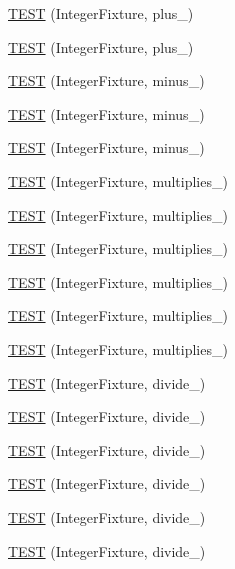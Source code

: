 \begin{DoxyCompactItemize}
\hyperlink{TestInteger_8c_09_09_ad03208e58b9eef087cde74731ea07ea2}{T\-E\-S\-T} (Integer\-Fixture, plus\-\_)
\item 
\hyperlink{TestInteger_8c_09_09_a5a765a1610e8accb499b8c9cc326b8bd}{T\-E\-S\-T} (Integer\-Fixture, plus\-\_)
\item 
\hyperlink{TestInteger_8c_09_09_a66b76ebde47a0ba4baf1e86b594f9b6b}{T\-E\-S\-T} (Integer\-Fixture, minus\-\_)
\item 
\hyperlink{TestInteger_8c_09_09_abc50c0136b8f986105ddb45228e0e588}{T\-E\-S\-T} (Integer\-Fixture, minus\-\_)
\item 
\hyperlink{TestInteger_8c_09_09_a7d88a5482163de39f2bef6f917b6cf05}{T\-E\-S\-T} (Integer\-Fixture, minus\-\_)
\item 
\hyperlink{TestInteger_8c_09_09_a52490569c8c649dc4ea3c13a951efa87}{T\-E\-S\-T} (Integer\-Fixture, multiplies\-\_)
\item 
\hyperlink{TestInteger_8c_09_09_a9b9d314f2b870242605005cd5eb9759d}{T\-E\-S\-T} (Integer\-Fixture, multiplies\-\_)
\item 
\hyperlink{TestInteger_8c_09_09_a36932743fa35b401741d33e46e51e4f8}{T\-E\-S\-T} (Integer\-Fixture, multiplies\-\_)
\item 
\hyperlink{TestInteger_8c_09_09_a229a726c89974a46e594b28a61b51933}{T\-E\-S\-T} (Integer\-Fixture, multiplies\-\_)
\item 
\hyperlink{TestInteger_8c_09_09_a0095bfbc5d9a6c19e76389d113aba7df}{T\-E\-S\-T} (Integer\-Fixture, multiplies\-\_)
\item 
\hyperlink{TestInteger_8c_09_09_aa85c30ebcf3b04d03b587542cbcf4802}{T\-E\-S\-T} (Integer\-Fixture, multiplies\-\_)
\item 
\hyperlink{TestInteger_8c_09_09_a8f50ec3851e8d2f79849a0de878e624b}{T\-E\-S\-T} (Integer\-Fixture, divide\-\_)
\item 
\hyperlink{TestInteger_8c_09_09_a6807f37566bc55344ca3271f3a385eb5}{T\-E\-S\-T} (Integer\-Fixture, divide\-\_)
\item 
\hyperlink{TestInteger_8c_09_09_aef4b9a0a9040642123a311675860aa9d}{T\-E\-S\-T} (Integer\-Fixture, divide\-\_)
\item 
\hyperlink{TestInteger_8c_09_09_a94adfa9c191aae162e9c8a73756f0eae}{T\-E\-S\-T} (Integer\-Fixture, divide\-\_)
\item 
\hyperlink{TestInteger_8c_09_09_a939be6f05bcb4ddbbcdce2e3e4b35588}{T\-E\-S\-T} (Integer\-Fixture, divide\-\_)
\item 
\hyperlink{TestInteger_8c_09_09_ae04cc8ff5c46119b04fed8f9ba8fa4c3}{T\-E\-S\-T} (Integer\-Fixture, divide\-\_)

\end{DoxyCompactItemize}
